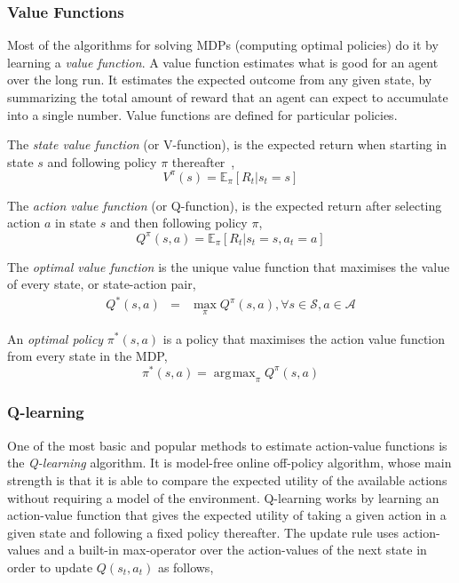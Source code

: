 \documentclass[a4paper]{article}
\DeclareMathOperator*{\argmax}{\arg\!\max}
\begin{document}
\subsubsection{Value Functions}

Most of the algorithms for solving MDPs (computing optimal policies) do it by learning a \emph{value function}. A value function estimates what is good for an agent over the long run. It estimates the expected outcome from any given state, by summarizing the
total amount of reward that an agent can expect to accumulate into a single number. Value functions are defined for particular policies.

The \emph{state value function} (or V-function), is the expected return when starting in state $s$ and following policy $\pi$ thereafter~\citep{Sutton1998RL},
%
\begin{equation}
V^\pi(s) = \mathbb{E}_\pi \left[R_t | s_t = s \right]
\end{equation}

The \emph{action value function} (or Q-function), is the expected return after selecting action $a$ in state $s$ and then following policy $\pi$,
%
\begin{equation}
Q^\pi(s,a) = \mathbb{E}_\pi \left[ R_t | s_t = s, a_t = a \right]
\end{equation}

The \emph{optimal value function} is the unique value function that maximises the value of every state, or state-action pair,
%
\begin{eqnarray}
Q^*(s,a) & = & \max\limits_\pi Q^\pi(s,a), \forall s \in \mathcal{S}, a \in \mathcal{A}
\end{eqnarray}

An \emph{optimal policy} $\pi^*(s,a)$ is a policy that maximises the action value function from every state in the MDP,
%
\begin{equation}
    \pi^*(s,a) = \argmax_\pi Q^\pi(s, a)
\end{equation}

\subsubsection{Q-learning}

One of the most basic and popular methods to estimate action-value functions is the \emph{Q-learning} algorithm. It is model-free online off-policy algorithm, whose main strength is that it is able to compare the expected utility of the available actions without requiring a model of the environment. Q-learning works by learning an action-value function that gives the expected utility of taking a given action in a given state and following a fixed policy thereafter. The update rule uses action-values and a built-in max-operator over the action-values of the next state in order to update $Q(s_t, a_t)$ as follows,
\end{document}
